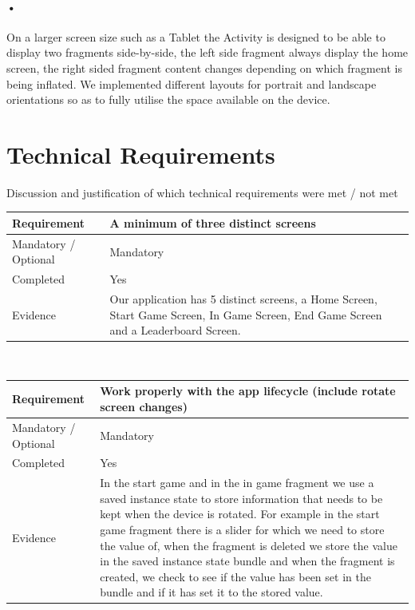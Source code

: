 \documentclass[10pt, a4paper]{article}
\begin{document}
\paragraph*{•}
On a larger screen size such as a Tablet the Activity is designed to be able to display two fragments side-by-side, the left side fragment always display the home screen, the right sided fragment content changes depending on which fragment is being inflated. We implemented different layouts for portrait and landscape orientations so as to fully utilise the space available on the device.

\newpage

\section*{Technical Requirements}
Discussion and justification of which technical requirements were met / not met
\\
\linebreak
\begin{tabular}{|p{} | p{}|}
\hline 
Requirement & A minimum of three distinct screens \\ 
\hline 
Mandatory / Optional & Mandatory \\ 
\hline 
Completed & Yes \\ 
\hline 
Evidence & Our application has 5 distinct screens, a Home Screen, Start Game Screen, In Game Screen, End Game Screen and a Leaderboard Screen. \\ 
\hline 
\end{tabular} 
\\
\linebreak
\linebreak
\begin{tabular}{|p{} | p{}|}
\hline 
Requirement & Work properly with the app lifecycle (include rotate screen changes) \\ 
\hline 
Mandatory / Optional & Mandatory \\ 
\hline 
Completed & Yes \\ 
\hline 
Evidence & In the start game and in the in game fragment we use a saved instance state to store information that needs to be kept when the device is rotated. For example in the start game fragment there is a slider for which we need to store the value of, when the fragment is deleted we store the value in the saved instance state bundle and when the fragment is created, we check to see if the value has been set in the bundle and if it has set it to the stored value. \\ 
\hline 
\end{tabular} 
\end{document}
